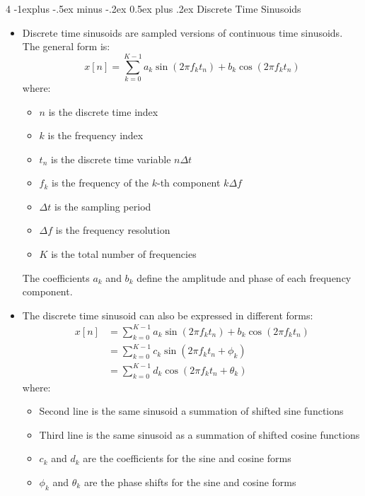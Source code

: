 \documentclass[10pt, landscape]{article}
\makeatletter
\renewcommand{\subsection}{\@startsection{subsection}{2}{0mm}%
  {-1explus -.5ex minus -.2ex}%
  {0.5ex plus .2ex}%
{\normalfont\normalsize\bfseries}}
\makeatother
\begin{document}
\begin{multicols*}{4}
  \subsection{Discrete Time Sinusoids}
  \begin{itemize}
    \item Discrete time sinusoids are sampled versions of continuous time sinusoids. The general form is:
    \begin{equation}
      x[n] = \sum_{k=0}^{K-1} a_k \sin(2 \pi f_k t_n) + b_k \cos(2 \pi f_k t_n)
    \end{equation}
    where:
    \begin{itemize}
      \item $n$ is the discrete time index
      \item $k$ is the frequency index
      \item $t_n$ is the discrete time variable $n \Delta t$
      \item $f_k$ is the frequency of the $k$-th component $k \Delta f$
      \item $\Delta t$ is the sampling period
      \item $\Delta f$ is the frequency resolution
      \item $K$ is the total number of frequencies
    \end{itemize}
    The coefficients $a_k$ and $b_k$ define the amplitude and phase of each frequency component.
    \item The discrete time sinusoid can also be expressed in different forms:
    \begin{equation}
      \begin{aligned}
      x[n] & = \sum_{k=0}^{K-1} a_k \sin(2 \pi f_k t_n) + b_k \cos(2 \pi f_k t_n) \\ 
           & = \sum_{k=0}^{K-1} c_k \sin(2 \pi f_k t_n + \phi_k) \\ 
           & = \sum_{k=0}^{K-1} d_k \cos(2 \pi f_k t_n + \theta_k)
      \end{aligned}
    \end{equation}
    where:
    \begin{itemize}
      \item Second line is the same sinusoid a summation of shifted sine functions
      \item Third line is the same sinusoid as a summation of shifted cosine functions
      \item $c_k$ and $d_k$ are the coefficients for the sine and cosine forms
      \item $\phi_k$ and $\theta_k$ are the phase shifts for the sine and cosine forms

\end{itemize}
\end{itemize}
\end{multicols*}
\end{document}
